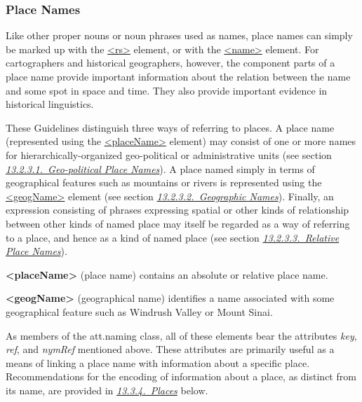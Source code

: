 \subsubsection[{Place Names}]{Place Names}\label{NDPLAC}\par
Like other proper nouns or noun phrases used as names, place names can simply be marked up with the \hyperref[TEI.rs]{<rs>} element, or with the \hyperref[TEI.name]{<name>} element. For cartographers and historical geographers, however, the component parts of a place name provide important information about the relation between the name and some spot in space and time. They also provide important evidence in historical linguistics.\par
These Guidelines distinguish three ways of referring to places. A place name (represented using the \hyperref[TEI.placeName]{<placeName>} element) may consist of one or more names for hierarchically-organized geo-political or administrative units (see section \textit{\hyperref[NDPLGU]{13.2.3.1.\ Geo-political Place Names}}). A place named simply in terms of geographical features such as mountains or rivers is represented using the \hyperref[TEI.geogName]{<geogName>} element (see section \textit{\hyperref[NDPLGF]{13.2.3.2.\ Geographic Names}}). Finally, an expression consisting of phrases expressing spatial or other kinds of relationship between other kinds of named place may itself be regarded as a way of referring to a place, and hence as a kind of named place (see section \textit{\hyperref[NDPLR]{13.2.3.3.\ Relative Place Names}}). 
\begin{sansreflist}
  
\item [\textbf{<placeName>}] (place name) contains an absolute or relative place name.
\item [\textbf{<geogName>}] (geographical name) identifies a name associated with some geographical feature such as Windrush Valley or Mount Sinai.
\end{sansreflist}
\par
As members of the \textsf{att.naming} class, all of these elements bear the attributes {\itshape key}, {\itshape ref}, and {\itshape nymRef} mentioned above. These attributes are primarily useful as a means of linking a place name with information about a specific place. Recommendations for the encoding of information about a place, as distinct from its name, are provided in \textit{\hyperref[NDGEOG]{13.3.4.\ Places}} below.\par

